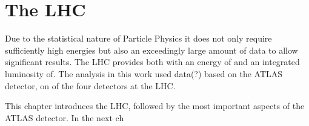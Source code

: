 \section{The LHC}

Due to the statistical nature of Particle Physics it does not only require sufficiently high energies but also an exceedingly large amount of data to allow significant results.
The LHC provides both with an energy of and an integrated luminosity of.
The analysis in this work used data(?) based on the ATLAS detector, on of the four detectors at the LHC.

This chapter introduces the LHC, followed by the most important aspects of the ATLAS detector. In the next ch